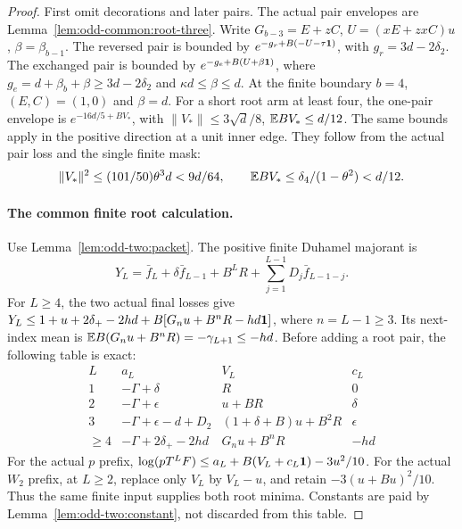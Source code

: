 \begin{proof}
First omit decorations and later pairs. The actual pair envelopes are
Lemma~\ref{lem:odd-common:root-three}. Write
\(G_{b-3}=E+zC\), \(U=(xE+zxC)u\), \(\beta=\beta_{b-1}\).
The reversed pair is bounded by
\(e^{-g_r+B(-U-\tau\mathbf1)}\), with
\(g_r=3d-2\delta_2\). The exchanged pair is bounded by
\(e^{-g_e+B(U+\beta\mathbf1)}\), where
\(g_e=d+\beta_b+\beta\ge3d-2\delta_2\) and
\(\kappa d\le\beta\le d\).
At the finite boundary \(b=4\), \((E,C)=(1,0)\) and \(\beta=d\).
For a short root arm at least four, the one-pair envelope is
\(e^{-16d/5+BV_*}\), with
\(\|V_*\|\le3\sqrt d/8\), \(\mathbb E BV_*\le d/12\).
The same bounds apply in the positive direction at a unit inner edge.
They follow from the actual pair loss and the single finite mask:
\[
 \|V_*\|^2\le(101/50)\theta^3d<9d/64,
 \qquad \mathbb E BV_*\le\delta_4/(1-\theta^2)<d/12.
\]

\paragraph{The common finite root calculation.}
Use Lemma~\ref{lem:odd-two:packet}. The positive finite Duhamel majorant is
\[
 Y_L=\bar f_L+\delta\bar f_{L-1}+B^LR
                   +\sum_{j=1}^{L-1}D_j\bar f_{L-1-j}.
\]
For \(L\ge4\), the two actual final losses give
\(Y_L\le1+u+2\delta_+-2hd+B[G_nu+B^nR-hd\mathbf1]\),
where \(n=L-1\ge3\). Its next-index mean is
\(\mathbb E B(G_nu+B^nR)=-\gamma_{L+1}\le-hd\).
Before adding a root pair, the following table is exact:
\[
\begin{array}{c|c|c|c}
L&a_L&V_L&c_L\\\hline
1&-\Gamma+\delta&R&0\\
2&-\Gamma+\epsilon&u+BR&\delta\\
3&-\Gamma+\epsilon-d+D_2&(1+\delta+B)u+B^2R&\epsilon\\
\ge4&-\Gamma+2\delta_+-2hd&G_nu+B^nR&-hd
\end{array}
\]
For the actual \(p\) prefix,
\(\log(pT^LF)\le a_L+B(V_L+c_L\mathbf1)-3u^2/10\).
For the actual \(W_2\) prefix, at \(L\ge2\), replace only
\(V_L\) by \(V_L-u\), and retain \(-3(u+Bu)^2/10\).
Thus the same finite input supplies both root minima. Constants are paid
by Lemma~\ref{lem:odd-two:constant}, not discarded from this table.


\end{proof}
